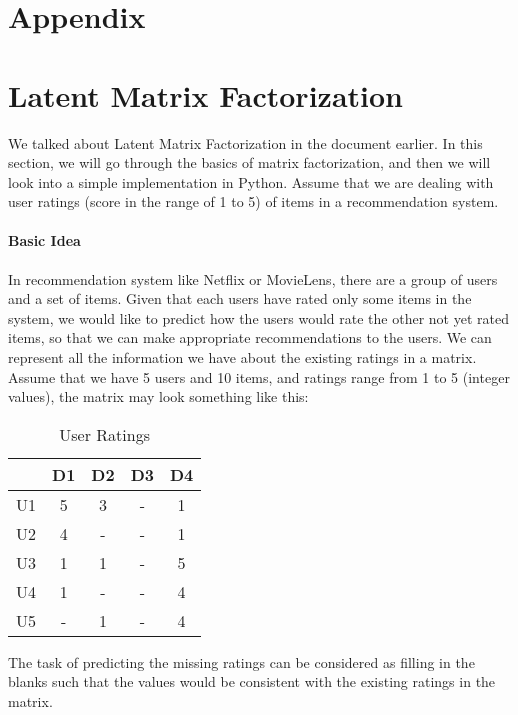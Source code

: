 \newpage
\appendix
\section*{Appendix}
\section{Latent Matrix Factorization}
 We talked about Latent Matrix Factorization in the document earlier. In this section, we will go through the basics of matrix factorization, and then we will look into a simple implementation in Python. Assume that we are dealing with user ratings (score in the range of 1 to 5) of items in a recommendation system.

\paragraph{Basic Idea}
 In recommendation system like Netflix or MovieLens, there are a group of users and a set of items. Given that each users have rated only some items in the system, we would like to predict how the users would rate the other not yet rated items, so that we can make appropriate recommendations to the users. We can represent all the information we have about the existing ratings in a matrix. Assume that we have 5 users and 10 items, and ratings range from 1 to 5 (integer values), the matrix may look something like this:

\begin{table}[ht]
\caption{User Ratings}
\centering %
\begin{tabular}{c c c c c}
\hline\hline %
& D1 & D2 & D3 & D4 \\ [0.5ex] %
\hline %
U1 & 5 & 3 & - & 1\\ %
U2 & 4 & - & - & 1\\
U3 & 1 & 1 & - & 5\\
U4 & 1 & - & - & 4\\
U5 & - & 1 & - & 4\\ [1ex] %
\hline %
\end{tabular}
\end{table}

 The task of predicting the missing ratings can be considered as filling in the blanks such that the values would be consistent with the existing ratings in the matrix.
 

